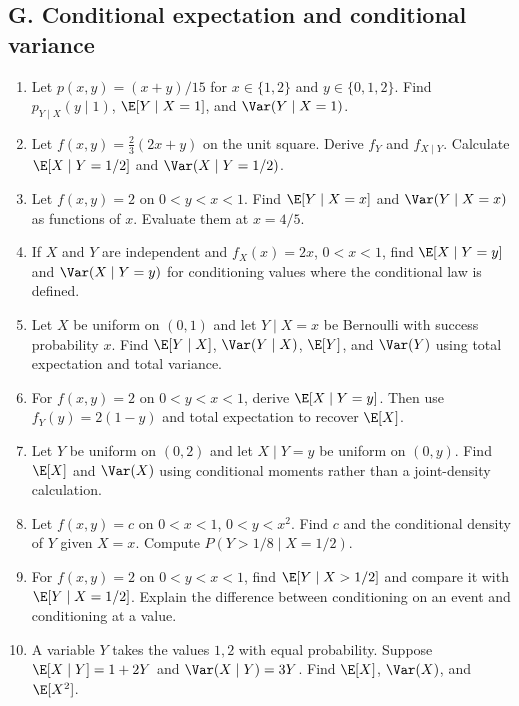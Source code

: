 \subsection{G. Conditional expectation and conditional variance}
\begin{enumerate}[label=\textbf{G\arabic*.},leftmargin=*,itemsep=0.75em]
\item Let $p(x,y)=(x+y)/15$ for $x\in\{1,2\}$ and $y\in\{0,1,2\}$. Find $p_{Y\mid X}(y\mid1)$, $\E[Y\mid X=1]$, and $\Var(Y\mid X=1)$.
\item Let $f(x,y)=\tfrac23(2x+y)$ on the unit square. Derive $f_Y$ and $f_{X\mid Y}$. Calculate $\E[X\mid Y=1/2]$ and $\Var(X\mid Y=1/2)$.
\item Let $f(x,y)=2$ on $0<y<x<1$. Find $\E[Y\mid X=x]$ and $\Var(Y\mid X=x)$ as functions of $x$. Evaluate them at $x=4/5$.
\item If $X$ and $Y$ are independent and $f_X(x)=2x$, $0<x<1$, find $\E[X\mid Y=y]$ and $\Var(X\mid Y=y)$ for conditioning values where the conditional law is defined.
\item Let $X$ be uniform on $(0,1)$ and let $Y\mid X=x$ be Bernoulli with success probability $x$. Find $\E[Y\mid X]$, $\Var(Y\mid X)$, $\E[Y]$, and $\Var(Y)$ using total expectation and total variance.
\item For $f(x,y)=2$ on $0<y<x<1$, derive $\E[X\mid Y=y]$. Then use $f_Y(y)=2(1-y)$ and total expectation to recover $\E[X]$.
\item Let $Y$ be uniform on $(0,2)$ and let $X\mid Y=y$ be uniform on $(0,y)$. Find $\E[X]$ and $\Var(X)$ using conditional moments rather than a joint-density calculation.
\item Let $f(x,y)=c$ on $0<x<1$, $0<y<x^2$. Find $c$ and the conditional density of $Y$ given $X=x$. Compute $P(Y>1/8\mid X=1/2)$.
\item For $f(x,y)=2$ on $0<y<x<1$, find $\E[Y\mid X>1/2]$ and compare it with $\E[Y\mid X=1/2]$. Explain the difference between conditioning on an event and conditioning at a value.
\item A variable $Y$ takes the values $1,2$ with equal probability. Suppose $\E[X\mid Y]=1+2Y$ and $\Var(X\mid Y)=3Y$. Find $\E[X]$, $\Var(X)$, and $\E[X^2]$.
\end{enumerate}
